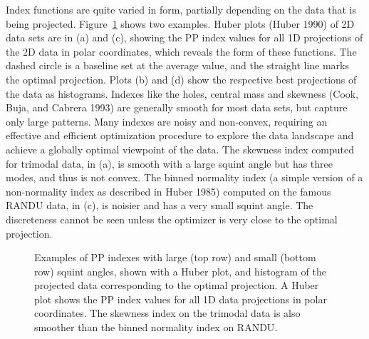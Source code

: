 \documentclass[
  12pt,
]{interact}
\theoremstyle{plain}
\begin{document}
Index functions are quite varied in form, partially depending on the
data that is being projected. Figure~\ref{fig-example-functions} shows
two examples. Huber plots (Huber 1990) of 2D data sets are in (a) and
(c), showing the PP index values for all 1D projections of the 2D data
in polar coordinates, which reveals the form of these functions. The
dashed circle is a baseline set at the average value, and the straight
line marks the optimal projection. Plots (b) and (d) show the respective
best projections of the data as histograms. Indexes like the holes,
central mass and skewness (Cook, Buja, and Cabrera 1993) are generally
smooth for most data sets, but capture only large patterns. Many indexes
are noisy and non-convex, requiring an effective and efficient
optimization procedure to explore the data landscape and achieve a
globally optimal viewpoint of the data. The skewness index computed for
trimodal data, in (a), is smooth with a large squint angle but has three
modes, and thus is not convex. The binned normality index (a simple
version of a non-normality index as described in Huber 1985) computed on
the famous RANDU data, in (c), is noisier and has a very small squint
angle. The discreteness cannot be seen unless the optimizer is very
close to the optimal projection.

\begin{figure}


\caption{\label{fig-example-functions}Examples of PP indexes with large
(top row) and small (bottom row) squint angles, shown with a Huber plot,
and histogram of the projected data corresponding to the optimal
projection. A Huber plot shows the PP index values for all 1D data
projections in polar coordinates. The skewness index on the trimodal
data is also smoother than the binned normality index on RANDU.}

\end{figure}%
\end{document}
